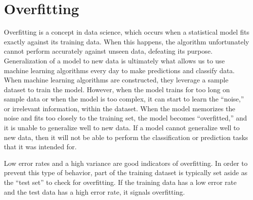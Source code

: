 \section{Overfitting}
\FloatBarrier
Overfitting is a concept in data science, which occurs when a statistical model fits exactly
against its training data. 
When this happens, the algorithm unfortunately cannot perform accurately against unseen data,
defeating its purpose.
Generalization of a model to new data is ultimately what allows us to use machine learning
algorithms every day to make predictions and classify data.
When machine learning algorithms are constructed, they leverage a sample dataset 
to train the model. 
However, when the model trains for too long on sample data or when the model is too complex, 
it can start to learn the “noise,” or irrelevant information, within the dataset. 
When the model memorizes the noise and fits too closely to the training set, 
the model becomes “overfitted,” and it is unable to generalize well to new data.
If a model cannot generalize well to new data, then it will not be able to perform the
classification or prediction tasks that it was intended for.

Low error rates and a high variance are good indicators of overfitting.
In order to prevent this type of behavior, part of the training dataset is typically set aside 
as the “test set” to check for overfitting. 
If the training data has a low error rate and the test data has a high error rate, 
it signals overfitting.

